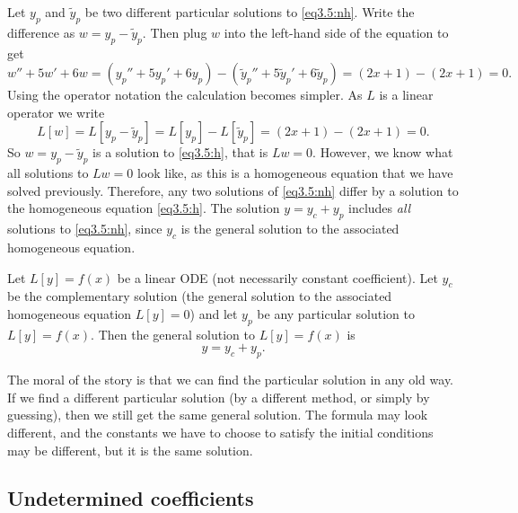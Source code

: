 \documentclass{ximera}
\begin{document}
Let $y_p$ and $\tilde{y}_p$ be two different particular solutions to \eqref{eq3.5:nh}. Write the difference as $w = y_p - \tilde{y}_p$.  Then plug $w$ into the left-hand side of the equation to get
\begin{equation*}
    w'' + 5w'+ 6w = (y_p'' + 5y_p'+ 6y_p) - (\tilde{y}_p'' + 5\tilde{y}_p'+ 6\tilde{y}_p) = (2x+1) - (2x+1) = 0 .
\end{equation*}
Using the operator notation the calculation becomes simpler.
As $L$ is a linear operator we write
\begin{equation*}
    L[w] = L[y_p - \tilde{y}_p] = L[y_p] - L[\tilde{y}_p] = (2x+1)-(2x+1) = 0 .
\end{equation*}
So $w = y_p - \tilde{y}_p$ is a solution to \eqref{eq3.5:h}, that is $Lw = 0$. However, we know what all solutions to $Lw = 0$ look like, as this is a homogeneous equation that we have solved previously. Therefore, any two solutions of \eqref{eq3.5:nh} differ by a solution to the homogeneous equation \eqref{eq3.5:h}.  The solution $y = y_c + y_p$ includes \emph{all} solutions to \eqref{eq3.5:nh}, since $y_c$ is the general solution to the associated homogeneous equation.

\begin{theorem}{}
    Let $L[y]=f(x)$ be a linear ODE (not necessarily constant coefficient).  Let $y_c$ be the complementary solution (the general solution to the associated homogeneous equation $L[y] = 0$) and let $y_p$ be any particular solution to $L[y]=f(x)$.  Then the general solution to $L[y]=f(x)$ is
    \begin{equation*}
        y = y_c + y_p.
    \end{equation*}
\end{theorem}

The moral of the story is that we can find the particular solution in any old way.  If we find a different particular solution (by a different method, or simply by guessing), then we still get the same general solution. The formula may  look different, and the constants we have to choose to satisfy the initial conditions may be different, but it is the same solution.

\subsection{Undetermined coefficients}
\end{document}
